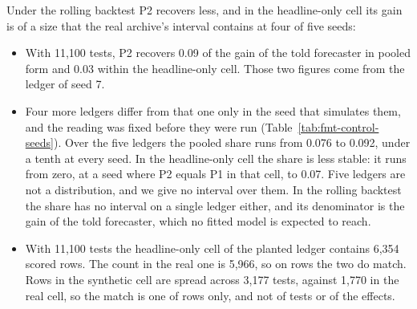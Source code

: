 Under the rolling backtest P2 recovers less, and in the headline-only cell its gain is of a size that the real archive's interval contains at four of five seeds:
\begin{itemize}
\item With 11,100 tests, P2 recovers 0.09 of the gain of the told forecaster in pooled form and 0.03 within the headline-only cell. Those two figures come from the ledger of seed 7.
\item Four more ledgers differ from that one only in the seed that simulates them, and the reading was fixed before they were run (Table~\ref{tab:fmt-control-seeds}). Over the five ledgers the pooled share runs from 0.076 to 0.092, under a tenth at every seed. In the headline-only cell the share is less stable: it runs from zero, at a seed where P2 equals P1 in that cell, to 0.07. Five ledgers are not a distribution, and we give no interval over them. In the rolling backtest the share has no interval on a single ledger either, and its denominator is the gain of the told forecaster, which no fitted model is expected to reach.
\item With 11,100 tests the headline-only cell of the planted ledger contains 6,354 scored rows. The count in the real one is 5,966, so on rows the two do match. Rows in the synthetic cell are spread across 3,177 tests, against 1,770 in the real cell, so the match is one of rows only, and not of tests or of the effects.

\end{itemize}
